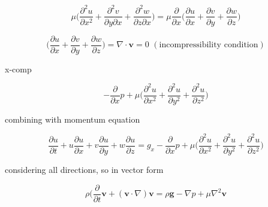 \documentclass[twocolumn,12pth]{article}
\begin{document}
\begin{equation}
\mu \bigg( \frac{\partial^2u}{\partial{x}^2} + \frac{\partial^2v}{\partial{y}\partial{x}} + \frac{\partial^2w}{\partial{z}\partial{x}}  \bigg) = \mu \frac{\partial}{\partial{x}} \bigg( \frac{\partial{u}}{\partial{x}} + \frac{\partial{v}}{\partial{y}} + \frac{\partial{w}}{\partial{z}}  \bigg)
\end{equation}

\begin{equation}
\bigg( \frac{\partial{u}}{\partial{x}} + \frac{\partial{v}}{\partial{y}} + \frac{\partial{w}}{\partial{z}}  \bigg) = \nabla \cdot  \mathbf{v} = 0 \,\, (\mathrm{incompressibility \,\, condition})
\end{equation}

x-comp

\begin{equation}
-\frac{\partial}{\partial{x}}p + \mu \bigg( \frac{\partial^2u}{\partial{x}^2} + \frac{\partial^2u}{\partial{y}^2} + \frac{\partial^2u}{\partial{z}^2} \bigg)
\end{equation}

combining with momentum equation

\begin{equation}
\frac{\partial{u}}{\partial{t}} + u\frac{\partial{u}}{\partial{x}} + v\frac{\partial{u}}{\partial{y}} + w\frac{\partial{u}}{\partial{z}} = g_x -\frac{\partial}{\partial{x}}p + \mu \bigg( \frac{\partial^2u}{\partial{x}^2} + \frac{\partial^2u}{\partial{y}^2} + \frac{\partial^2u}{\partial{z}^2} \bigg)
\end{equation}

considering all directions, so in vector form

\begin{equation}
\rho(\frac{\partial}{\partial{t}} \mathbf{v} + (\mathbf{v} \cdot \nabla)\mathbf{v} = \rho\mathbf{g} - \nabla{p} + \mu\nabla^2{\mathbf{v}}
\end{equation}


\nocite{*}

\end{document}
